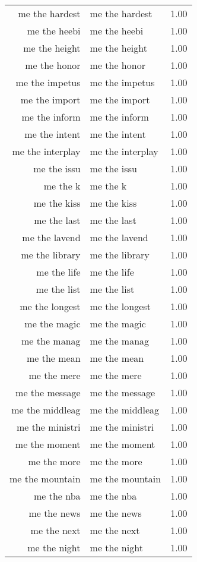\begin{table}[ht]
\begin{tabular}{rlr}
  me the hardest & me the hardest & 1.00 \\ 
  me the heebi & me the heebi & 1.00 \\ 
  me the height & me the height & 1.00 \\ 
  me the honor & me the honor & 1.00 \\ 
  me the impetus & me the impetus & 1.00 \\ 
  me the import & me the import & 1.00 \\ 
  me the inform & me the inform & 1.00 \\ 
  me the intent & me the intent & 1.00 \\ 
  me the interplay & me the interplay & 1.00 \\ 
  me the issu & me the issu & 1.00 \\ 
  me the k & me the k & 1.00 \\ 
  me the kiss & me the kiss & 1.00 \\ 
  me the last & me the last & 1.00 \\ 
  me the lavend & me the lavend & 1.00 \\ 
  me the library & me the library & 1.00 \\ 
  me the life & me the life & 1.00 \\ 
  me the list & me the list & 1.00 \\ 
  me the longest & me the longest & 1.00 \\ 
  me the magic & me the magic & 1.00 \\ 
  me the manag & me the manag & 1.00 \\ 
  me the mean & me the mean & 1.00 \\ 
  me the mere & me the mere & 1.00 \\ 
  me the message & me the message & 1.00 \\ 
  me the middleag & me the middleag & 1.00 \\ 
  me the ministri & me the ministri & 1.00 \\ 
  me the moment & me the moment & 1.00 \\ 
  me the more & me the more & 1.00 \\ 
  me the mountain & me the mountain & 1.00 \\ 
  me the nba & me the nba & 1.00 \\ 
  me the news & me the news & 1.00 \\ 
  me the next & me the next & 1.00 \\ 
  me the night & me the night & 1.00 \\ 

\end{tabular}
\end{table}
